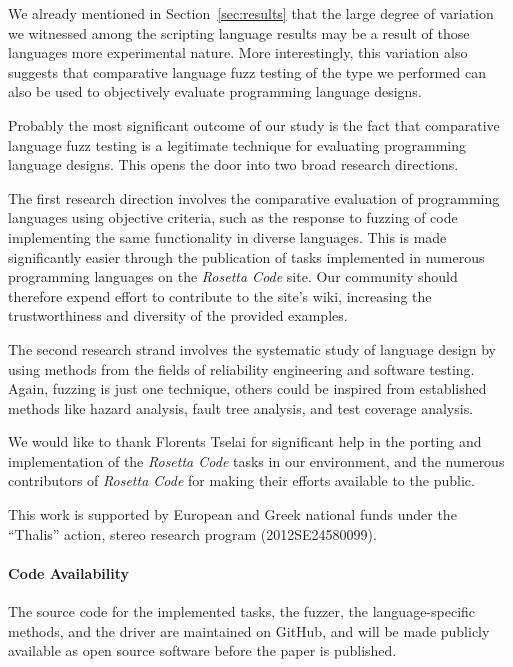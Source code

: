 \documentclass[10pt]{sigplanconf}
\begin{document}
We already mentioned in Section~\ref{sec:results} that the
large degree of variation we witnessed among the scripting
language results may be a result of those languages
more experimental nature.
More interestingly, this variation also suggests that
comparative language fuzz testing of the type we performed
can also be used to objectively evaluate programming language
designs.

Probably the most significant outcome of our study is the
fact that comparative language fuzz testing is a
legitimate technique for evaluating programming language designs.
This opens the door into two broad research directions.

The first research direction involves the comparative evaluation
of programming languages using objective criteria,
such as the response to fuzzing of code implementing the same functionality
in diverse languages.
This is made significantly easier through the publication of
tasks implemented in numerous programming languages on the
{\em Rosetta Code} site.
Our community should therefore expend effort to contribute to
the site's wiki, increasing the trustworthiness and diversity of
the provided examples.

The second research strand involves the systematic study of
language design by using methods from the fields of reliability engineering
and software testing.
Again, fuzzing is just one technique, others could be inspired from
established methods like
hazard analysis,
fault tree analysis, and
test coverage analysis.

\acks

We would like to thank Florents Tselai for significant
help in the porting and implementation of the
{\em Rosetta Code} tasks in our environment,
and the numerous contributors of {\em Rosetta Code} for
making their efforts available to the public.

This work is supported by European and Greek national funds
under the ``Thalis'' action, {\sc stereo} research program
(2012SE24580099).

\paragraph{Code Availability} The source code for
the implemented tasks,
the fuzzer,
the language-specific methods, and
the driver are maintained on GitHub, and
will be made publicly available as open source software
before the paper is published.








\end{document}
